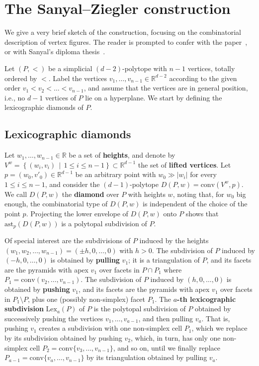 \documentclass[a4paper,leqno]{article}
\theoremstyle{definition}
\newcommand{\anst}{\mathrm{ast}}
\newcommand{\conv}{\mathrm{conv}}
\newcommand{\lex}{\mathrm{Lex}}
\newcommand{\set}[2]{\left\{ #1\,\middle|\, #2\right\}}
\newcommand{\R}{\mathbb{R}}
\begin{document}
\section{The Sanyal--Ziegler construction}\label{sec:SZ}

We give a very brief sketch of the construction, focusing on the combinatorial description of vertex figures. The reader is prompted to confer with the paper~\cite{SanyZ10}, or with Sanyal's diploma thesis~\cite{Sany05}.

Let $(P,<)$ be a simplicial $(d-2)$-polytope with $n-1$ vertices, totally ordered by $<$. Label the vertices $v_1,\dots,v_{n-1}\in\R^{d-2}$ according to the given order $v_1<v_2<\dots <v_{n-1}$, and assume that the vertices are in general position, i.e., no $d-1$ vertices of $P$ lie on a hyperplane. We start by defining the lexicographic diamonds of $P$.


\subsection{Lexicographic diamonds}

Let $w_1,\dots ,w_{n-1}\in\R$ be a set of {\bf heights}, and denote by $V^w=\set{(w_i,v_i)}{1\leq i\leq n-1}\subset\R^{d-1}$ the set of {\bf lifted vertices}. Let $p=(w_0,v'_0)\in\R^{d-1}$ be an arbitrary point with $w_0\gg |w_i|$ for every $1\leq i\leq n-1$, and consider the $(d-1)$-polytope $D(P,w)=\conv(V^w,p)$. We call $D(P,w)$ the {\bf diamond} over $P$ with
heights $w$, noting that, for $w_0$ big enough, the combinatorial type of $D(P,w)$ is independent of the choice of the point $p$.
Projecting the lower envelope of $D(P,w)$ onto $P$ shows that $\anst_p(D(P,w))$ is a polytopal subdivision of $P$.

Of special interest are the subdivisions of $P$ induced by the heights $(w_1,w_2,\dots,w_{n-1})=(\pm h,0,\dots,0)$ with $h>0$.
The subdivision of $P$ induced by $(-h,0,\dots,0)$ is obtained by {\bf pulling} $v_1$; it is a triangulation of $P$, and its facets are the pyramids with apex $v_1$ over facets in $P\cap P_1$ where $P_1=\conv(v_2,\dots,v_{n-1})$.
The subdivision of $P$ induced by $(h,0,\dots,0)$ is obtained by {\bf pushing} $v_1$, and its facets are the pyramids with apex $v_1$ over facets in $P_1\setminus P$, plus one (possibly non-simplex) facet $P_1$.
The {\bf $a$-th lexicographic subdivision} $\lex_a(P)$ of $P$ is the polytopal subdivision of $P$ obtained by successively pushing the vertices $v_1,\dots,v_{a-1}$, and then pulling $v_a$. That is, pushing $v_1$ creates a subdivision with one non-simplex cell $P_1$, which we replace by its subdivision obtained by pushing $v_2$, which, in turn, has only one non-simplex cell $P_2=\conv\{v_3,\dots ,v_{n-1} \}$, and so on, until we finally replace $P_{a-1}=\conv\{v_a,\dots, v_{n-1} \}$ by its triangulation obtained by pulling $v_a$.
\end{document}
